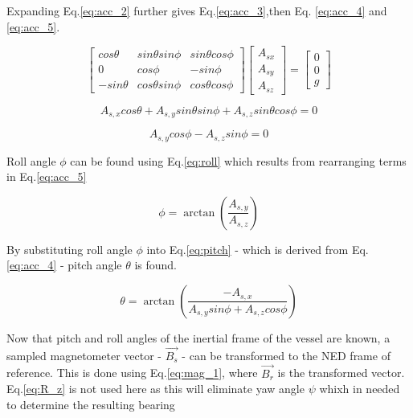 Expanding Eq.\ref{eq:acc_2} further gives Eq.\ref{eq:acc_3},then Eq. \ref{eq:acc_4} and \ref{eq:acc_5}.

\begin{equation}
    \label{eq:acc_3}
    \begin{bmatrix} cos\theta & sin\theta sin\phi & sin\theta cos\phi \\ 0 & cos\phi & -sin\phi \\ -sin\theta & cos\theta sin\phi & cos\theta cos\phi \end{bmatrix} \begin{bmatrix} A_{sx} \\ A_{sy} \\ A_{sz} \end{bmatrix}= \begin{bmatrix} 0 \\ 0 \\ g \end{bmatrix}
\end{equation}

\begin{equation}
    \label{eq:acc_4}
    A_{s,x}cos\theta + A_{s,y}sin\theta sin\phi + A_{s,z}sin\theta cos\phi = 0
\end{equation}

\begin{equation}
    \label{eq:acc_5}
    A_{s,y}cos\phi - A_{s,z}sin\phi = 0
\end{equation}

Roll angle $\phi$ can be found using Eq.\ref{eq:roll} which results from rearranging terms in Eq.\ref{eq:acc_5}

\begin{equation}
    \label{eq:roll}
    \phi = \arctan (\frac{A_{s,y}}{A_{s,z}})
\end{equation}

By substituting roll angle $\phi$ into Eq.\ref{eq:pitch} - which is derived from Eq.\ref{eq:acc_4} - pitch angle $\theta$ is found.

\begin{equation}
    \label{eq:pitch}
    \theta = \arctan( \frac{ -A_{s,x}}{A_{s,y}sin\phi + A_{s,z}cos\phi})
\end{equation}

Now that pitch and roll angles of the inertial frame of the vessel are known, a sampled magnetometer vector - $\vec{B_{s}}$ - can be transformed to the NED frame of reference. This is done
using Eq.\ref{eq:mag_1}, where $\vec{B_{r}}$ is the transformed vector. Eq.\ref{eq:R_z} is not used here as this will eliminate yaw angle $\psi$ whixh in needed to determine the resulting bearing

